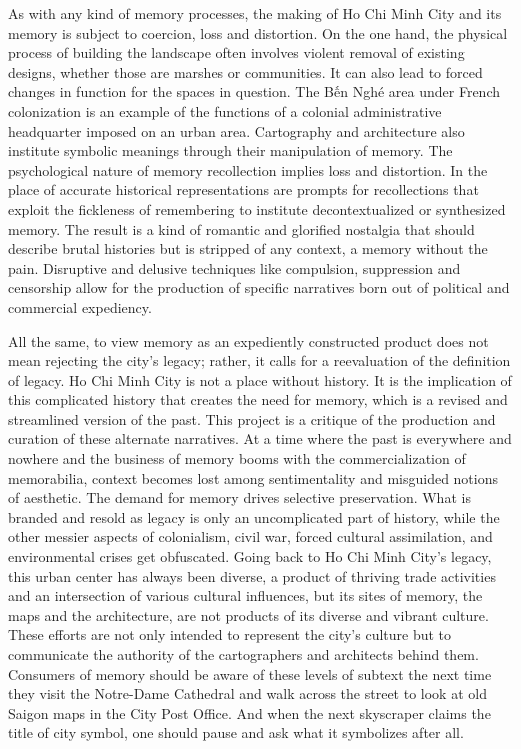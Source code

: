 As with any kind of memory processes, the making of Ho Chi Minh City and its memory is subject to coercion, loss and distortion. On the one hand, the physical process of building the landscape often involves violent removal of existing designs, whether those are marshes or communities. It can also lead to forced changes in function for the spaces in question. The Bến Nghé area under French colonization is an example of the functions of a colonial administrative headquarter imposed on an urban area. Cartography and architecture also institute symbolic meanings through their manipulation of memory. The psychological nature of memory recollection implies loss and distortion. In the place of accurate historical representations are prompts for recollections that exploit the fickleness of remembering to institute decontextualized or synthesized memory.  The result is a kind of romantic and glorified nostalgia that should describe brutal histories but is stripped of any context, a memory without the pain. Disruptive and delusive techniques like compulsion, suppression and censorship allow for the production of specific narratives born out of political and commercial expediency.

All the same, to view memory as an expediently constructed product does not mean rejecting the city’s legacy; rather, it calls for a reevaluation of the definition of legacy. Ho Chi Minh City is not a place without history. It is the implication of this complicated history that creates the need for memory, which is a revised and streamlined version of the past. This project is a critique of the production and curation of these alternate narratives. At a time where the past is everywhere and nowhere and the business of memory booms with the commercialization of memorabilia, context becomes lost among sentimentality and misguided notions of aesthetic. The demand for memory drives selective preservation. What is branded and resold as legacy is only an uncomplicated part of history, while the other messier aspects of colonialism, civil war, forced cultural assimilation, and environmental crises get obfuscated. Going back to Ho Chi Minh City’s legacy, this urban center has always been diverse, a product of thriving trade activities and an intersection of various cultural influences, but its sites of memory, the maps and the architecture, are not products of its diverse and vibrant culture. These efforts are not only intended to represent the city’s culture but to communicate the authority of the cartographers and architects behind them. Consumers of memory should be aware of these levels of subtext the next time they visit the Notre-Dame Cathedral and walk across the street to look at old Saigon maps in the City Post Office. And when the next skyscraper claims the title of city symbol, one should pause and ask what it symbolizes after all.


